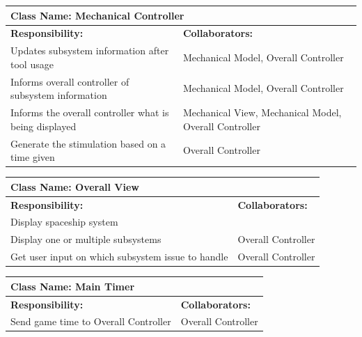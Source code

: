 \documentclass[12pt, titlepage]{article}
\begin{document}
	\begin{table}[H]
		\centering
		\begin{tabular}{|p{10cm}|p{5cm}|}
		\hline 
		 \multicolumn{2}{|l|}{\textbf{Class Name: Mechanical Controller}} \\
		\hline
		\textbf{Responsibility:} & \textbf{Collaborators:} \\
		\hline
		Updates subsystem information after tool usage & Mechanical Model, Overall Controller\\
		\hline
		 Informs overall controller of subsystem information & Mechanical Model, Overall Controller\\
		\hline
		 Informs the overall controller what is being displayed & Mechanical View, Mechanical Model, Overall Controller\\
		\hline
		 Generate the stimulation based on a time given & Overall Controller \\
		\hline
		\end{tabular}
	\end{table}

	\begin{table}[H]
		\centering
		\begin{tabular}{|p{10cm}|p{5cm}|}
		\hline 
		 \multicolumn{2}{|l|}{\textbf{Class Name: Overall View}} \\
		\hline
		\textbf{Responsibility:} & \textbf{Collaborators:} \\
		\hline
		 Display spaceship system & \\
		\hline
		Display one or multiple subsystems & Overall Controller\\
		\hline
		Get user input on which subsystem issue to handle & Overall Controller \\
		\hline
		\end{tabular}
	\end{table}

	\begin{table}[H]
		\centering
		\begin{tabular}{|p{10cm}|p{5cm}|}
		\hline 
		 \multicolumn{2}{|l|}{\textbf{Class Name: Main Timer}} \\
		\hline
		\textbf{Responsibility:} & \textbf{Collaborators:} \\
		\hline
		 Send game time to Overall Controller & Overall Controller\\
		\hline
		\end{tabular}
	\end{table}
\end{document}
